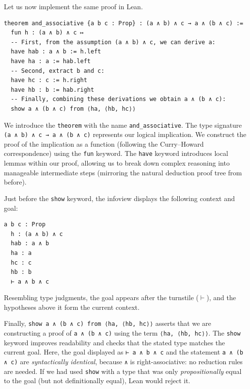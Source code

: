 \begin{example}
  Let us now implement the same proof in Lean.
  \begin{lstlisting}[language=lean]
theorem and_associative {a b c : Prop} : (a ∧ b) ∧ c → a ∧ (b ∧ c) :=
  fun h : (a ∧ b) ∧ c ↦
  -- First, from the assumption (a ∧ b) ∧ c, we can derive a:
  have hab : a ∧ b := h.left
  have ha : a := hab.left
  -- Second, extract b and c:
  have hc : c := h.right
  have hb : b := hab.right
  -- Finally, combining these derivations we obtain a ∧ (b ∧ c):
  show a ∧ (b ∧ c) from ⟨ha, ⟨hb, hc⟩⟩
  \end{lstlisting}
  We introduce the \lstinline[language=lean]|theorem| with the name
  \lstinline[language=lean]|and_associative|.
  The type signature
  \lstinline[language=lean]|(a ∧ b) ∧ c → a ∧ (b ∧ c)| represents
  our logical implication.
  We construct the proof of the implication as a function (following
  the Curry--Howard correspondence) using the
  \lstinline[language=lean]|fun| keyword.
  The \lstinline[language=lean]|have| keyword introduces local lemmas
  within our proof, allowing us to break down complex reasoning into
  manageable intermediate steps (mirroring the natural deduction
  proof tree from before).

  Just before the \lstinline[language=lean]|show| keyword, the
  infoview displays the following context and goal:
  \begin{lstlisting}[language=lean]
  a b c : Prop
  h : (a ∧ b) ∧ c
  hab : a ∧ b
  ha : a
  hc : c
  hb : b
  ⊢ a ∧ b ∧ c
  \end{lstlisting}
  Resembling type judgments, the goal appears after the turnstile
  ($\vdash$), and the hypotheses above it form the current context.

  Finally,
  \lstinline[language=lean]|show a ∧ (b ∧ c) from ⟨ha, ⟨hb, hc⟩⟩|
  asserts that we are constructing a proof of
  \lstinline[language=lean]|a ∧ (b ∧ c)| using the term
  \lstinline[language=lean]|⟨ha, ⟨hb, hc⟩⟩|.
  The \lstinline[language=lean]|show| keyword improves readability and
  checks that the stated type matches the current goal.
  Here, the goal displayed as
  \lstinline[language=lean]|⊢ a ∧ b ∧ c| and the statement
  \lstinline[language=lean]|a ∧ (b ∧ c)| are \emph{syntactically
    identical}, because \lstinline[language=lean]|∧| is
  right-associative: no reduction rules are needed.
  If we had used \lstinline[language=lean]|show| with a type that was
  only \emph{propositionally} equal to the goal (but not
  definitionally equal), Lean would reject it.
\end{example}

